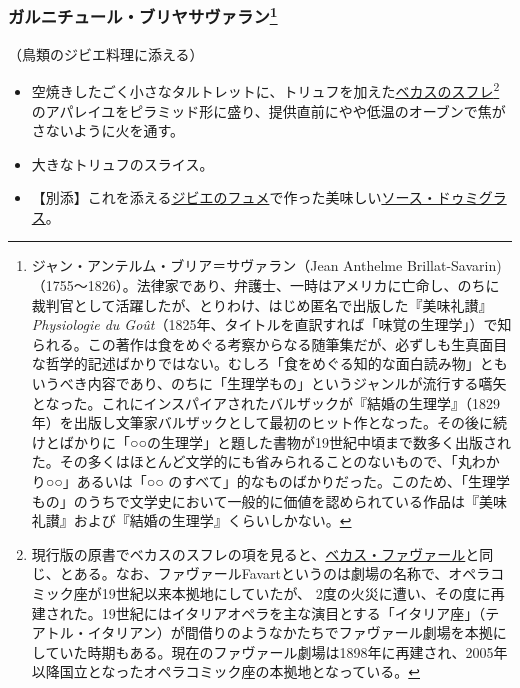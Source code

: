 \begin{recette}
{\subsubsection[ガルニチュール・ブリヤサヴァラン]{\texorpdfstring{ガルニチュール・ブリヤサヴァラン\footnote{ジャン・アンテルム・ブリア＝サヴァラン（Jean
  Anthelme
  Brillat-Savarin)（1755〜1826）。法律家であり、弁護士、一時はアメリカに亡命し、のちに裁判官として活躍したが、とりわけ、はじめ匿名で出版した『美味礼讃』\emph{Physiologie
  du
  Goût}（1825年、タイトルを直訳すれば「味覚の生理学」）で知られる。この著作は食をめぐる考察からなる随筆集だが、必ずしも生真面目な哲学的記述ばかりではない。むしろ「食をめぐる知的な面白読み物」ともいうべき内容であり、のちに「生理学もの」というジャンルが流行する嚆矢となった。これにインスパイアされたバルザックが『結婚の生理学』（1829年）を出版し文筆家バルザックとして最初のヒット作となった。その後に続けとばかりに「○○の生理学」と題した書物が19世紀中頃まで数多く出版された。その多くはほとんど文学的にも省みられることのないもので、「丸わかり○○」あるいは「○○
  のすべて」的なものばかりだった。このため、「生理学もの」のうちで文学史において一般的に価値を認められている作品は『美味礼讃』および『結婚の生理学』くらいしかない。}}{ガルニチュール・ブリヤサヴァラン}}\label{garniture-brillat-savarin}}



（鳥類のジビエ料理に添える）

\begin{itemize}
\item
  空焼きしたごく小さなタルトレットに、トリュフを加えた\protect\hyperlink{souffle-de-becasse}{ベカスのスフレ}\footnote{現行版の原書でベカスのスフレの項を見ると、\protect\hyperlink{becasse-favart}{ベカス・ファヴァール}と同じ、とある。なお、ファヴァールFavartというのは劇場の名称で、オペラコミック座が19世紀以来本拠地にしていたが、
    2度の火災に遭い、その度に再建された。19世紀にはイタリアオペラを主な演目とする「イタリア座」（テアトル・イタリアン）が間借りのようなかたちでファヴァール劇場を本拠にしていた時期もある。現在のファヴァール劇場は1898年に再建され、2005年以降国立となったオペラコミック座の本拠地となっている。}
  のアパレイユをピラミッド形に盛り、提供直前にやや低温のオーブンで焦がさないように火を通す。
\item
  大きなトリュフのスライス。
\item
  【別添】これを添える\protect\hyperlink{fonds-de-gibier}{ジビエのフュメ}で作った美味しい\protect\hyperlink{sauce-demi-glace}{ソース・ドゥミグラス}。
\end{itemize}


\end{recette}
